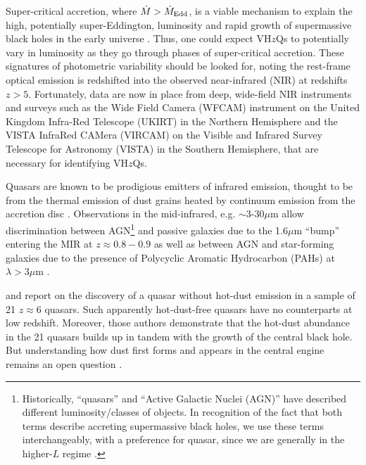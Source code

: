 \documentclass[usenatbib]{mnras}
\begin{document}
Super-critical accretion, where $\dot{M} > \dot{M}_{\rm Edd}$, is a
viable mechanism to explain the high, potentially super-Eddington,
luminosity and rapid growth of supermassive black holes in the early
universe \citep[e.g.,][]{AlexanderNatarajan2014, MadauHaardtDotti2014,
Volonteri2015, Pezzulli2016, Lupi2016, Pezzulli2017, Takeo2018}. Thus,
one could expect VH$z$Qs to potentially vary in luminosity as they go
through phases of super-critical accretion. These signatures of
photometric variability should be looked for, noting the rest-frame
optical emission is redshifted into the observed near-infrared (NIR)
at redshifts $z>5$. Fortunately, data are now in place from deep,
wide-field NIR instruments and surveys such as the Wide Field Camera
(WFCAM) instrument on the United Kingdom Infra-Red Telescope (UKIRT)
in the Northern Hemisphere and the VISTA InfraRed CAMera (VIRCAM) on
the Visible and Infrared Survey Telescope for Astronomy (VISTA) in the
Southern Hemisphere, that are necessary for identifying VH$z$Qs.

Quasars are known to be prodigious emitters of infrared emission,
thought to be from the thermal emission of dust grains heated by
continuum emission from the accretion disc
\citep[e.g.,][]{Richards2006b, Leipski2014, Hill2014,
Hickox2017}. Observations in the mid-infrared, e.g. $\sim$3-30$\mu$m
allow discrimination between AGN\footnote{Historically, ``quasars''
and ``Active Galactic Nuclei (AGN)'' have described different
luminosity/classes of objects. In recognition of the fact that both
terms describe accreting supermassive black holes, we use these terms
interchangeably, with a preference for quasar, since we are generally
in the higher-$L$ regime \citep[e.g.][]{Haardt2016book}.}  and passive
galaxies due to the 1.6$\mu$m ``bump'' entering the MIR at
$z\approx0.8-0.9$ \citep[e.g., ][]{Wright1994, Sawicki2002, Lacy2004,
Stern2005, Richards2006b, Timlin2016} as well as between AGN and
star-forming galaxies due to the presence of Polycyclic Aromatic
Hydrocarbon (PAHs) at $\lambda >3\mu$m \citep[e.g., ][]{Yan2007,
Tielens2008}.

\citet{Jiang2006dust} and \citet{Jiang2010} report on the discovery of
a quasar without hot-dust emission in a sample of 21 $z\approx6$
quasars. Such apparently hot-dust-free quasars have no counterparts at
low redshift. Moreover, those authors demonstrate that the hot-dust
abundance in the 21 quasars builds up in tandem with the growth of the
central black hole. But understanding how dust first forms and appears
in the central engine remains an open question \citep{WangR2008,
WangR2011}.
\end{document}
